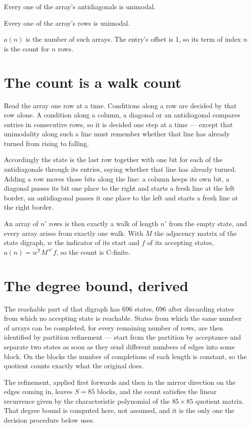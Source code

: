 \documentclass[11pt]{article}
\theoremstyle{definition}
\begin{document}
Every one of the array's antidiagonals is unimodal.

Every one of the array's rows is unimodal.

$a(n)$ is the number of such arrays. The entry's offset is 1, so its term of index $n$ is the count for $n$ rows.

\section{The count is a walk count}

Read the array one row at a time. Conditions along a row are decided by that row alone. A condition along a column, a diagonal or an antidiagonal compares entries in consecutive rows, so it is decided one step at a time --- except that unimodality along such a line must remember whether that line has already turned from rising to falling.

Accordingly the state is the last row together with one bit for each of the antidiagonals through its entries, saying whether that line has already turned. Adding a row moves those bits along the line: a column keeps its own bit, a diagonal passes its bit one place to the right and starts a fresh line at the left border, an antidiagonal passes it one place to the left and starts a fresh line at the right border.

An array of $n'$ rows is then exactly a walk of length $n'$ from the empty state, and every array arises from exactly one walk. With $M$ the adjacency matrix of the state digraph, $w$ the indicator of its start and $f$ of its accepting states, $a(n) = w^{\mathsf T}M^{\,n'}f$, so the count is C-finite.

\section{The degree bound, derived}

The reachable part of that digraph has $696$ states, $696$ after discarding states from which no accepting state is reachable. States from which the same number of arrays can be completed, for every remaining number of rows, are then identified by partition refinement --- start from the partition by acceptance and separate two states as soon as they send different numbers of edges into some block. On the blocks the number of completions of each length is constant, so the quotient counts exactly what the original does.

The refinement, applied first forwards and then in the mirror direction on the edges coming in, leaves $S = 85$ blocks, and the count satisfies the linear recurrence given by the characteristic polynomial of the $85 \times 85$ quotient matrix. That degree bound is computed here, not assumed, and it is the only one the decision procedure below uses.
\end{document}
